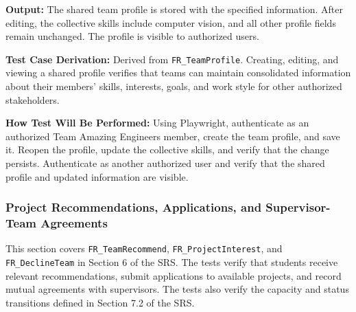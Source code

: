 \documentclass[12pt, titlepage]{article}
\begin{document}
\begin{enumerate}
\textbf{Output:} The shared team profile is stored with the specified information. After editing, the collective skills include computer vision, and all other profile fields remain unchanged. The profile is visible to authorized users.

\textbf{Test Case Derivation:} Derived from \texttt{FR\_TeamProfile}. Creating, editing, and viewing a shared profile verifies that teams can maintain consolidated information about their members' skills, interests, goals, and work style for other authorized stakeholders.

\textbf{How Test Will Be Performed:} Using Playwright, authenticate as an authorized Team Amazing Engineers member, create the team profile, and save it. Reopen the profile, update the collective skills, and verify that the change persists. Authenticate as another authorized user and verify that the shared profile and updated information are visible.

\end{enumerate}

\subsubsection{Project Recommendations, Applications, and Supervisor-Team Agreements}

This section covers \texttt{FR\_TeamRecommend}, \texttt{FR\_ProjectInterest}, and \texttt{FR\_DeclineTeam} in Section 6 of the SRS. The tests verify that students receive relevant recommendations, submit applications to available projects, and record mutual agreements with supervisors. The tests also verify the capacity and status transitions defined in Section 7.2 of the SRS.
\end{document}
